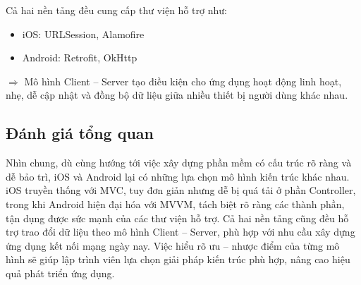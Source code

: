     \begin{flushleft}
      \hspace*{0.8cm}Cả hai nền tảng đều cung cấp thư viện hỗ trợ như:
      \setlength{\leftmargini}{1.5cm}
      \begin{itemize}
          \item iOS: URLSession, Alamofire
          \item Android: Retrofit, OkHttp
      \end{itemize}
    \end{flushleft}

    \begin{flushleft}
      \hspace*{0.8cm}$\Rightarrow$ Mô hình Client – Server tạo điều kiện cho ứng dụng hoạt động linh hoạt, nhẹ, dễ cập nhật và đồng bộ dữ liệu giữa nhiều thiết bị người dùng khác nhau.
    \end{flushleft}

\subsection{Đánh giá tổng quan}
\renewcommand{\labelitemi}{--}    
    \begin{flushleft}
        \hspace*{0.8cm}Nhìn chung, dù cùng hướng tới việc xây dựng phần mềm có cấu trúc rõ ràng và dễ bảo trì, iOS và Android lại có những lựa chọn mô hình kiến trúc khác nhau. iOS truyền thống với MVC, tuy đơn giản nhưng dễ bị quá tải ở phần Controller, trong khi Android hiện đại hóa với MVVM, tách biệt rõ ràng các thành phần, tận dụng được sức mạnh của các thư viện hỗ trợ. Cả hai nền tảng cũng đều hỗ trợ trao đổi dữ liệu theo mô hình Client – Server, phù hợp với nhu cầu xây dựng ứng dụng kết nối mạng ngày nay. Việc hiểu rõ ưu – nhược điểm của từng mô hình sẽ giúp lập trình viên lựa chọn giải pháp kiến trúc phù hợp, nâng cao hiệu quả phát triển ứng dụng.
    \end{flushleft}
